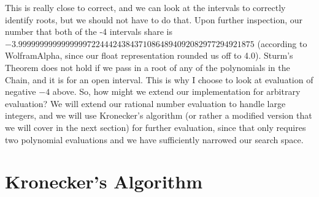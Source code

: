 \documentclass[]{article}
\theoremstyle{definition}
\begin{document}
This is really close to correct, and we can look at the intervals to correctly identify roots, but we should not have to do that. Upon further inspection, our number that both of the -4 intervals share is \newline $-3.9999999999999999722444243843710864894092082977294921875$ (according to WolframAlpha, since our float representation rounded us off to 4.0). Sturm's Theorem does not hold if we pass in a root of any of the polynomials in the Chain, and it is for an open interval. This is why I choose to look at evaluation of negative $-4$ above. So, how might we extend our implementation for arbitrary evaluation? We will extend our rational number evaluation to handle large integers, and we will use Kronecker's algorithm (or rather a modified version that we will cover in the next section) for further evaluation, since that only requires two polynomial evaluations and we have sufficiently narrowed our search space.

\section{Kronecker's Algorithm}




\newpage
\printbibliography
\end{document}
